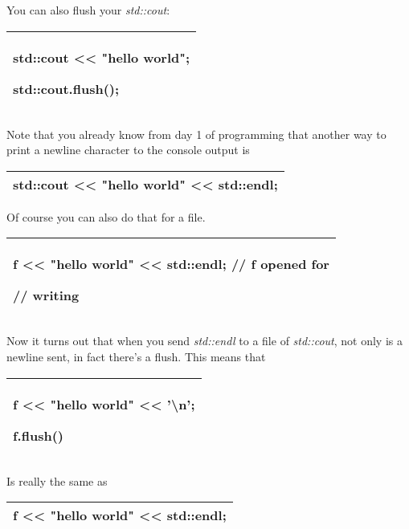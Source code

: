 \documentclass[
]{article}
\begin{document}
You can also flush your \emph{std::cout}:

\begin{longtable}[]{@{}l@{}}
\toprule
\endhead
\begin{minipage}[t]{0.97\columnwidth}\raggedright
std::cout \textless\textless{} "hello world";

std::cout.flush();\strut
\end{minipage}\tabularnewline
\bottomrule
\end{longtable}

Note that you already know from day 1 of programming that another way to
print a newline character to the console output is

\begin{longtable}[]{@{}l@{}}
\toprule
\endhead
std::cout \textless\textless{} "hello world" \textless\textless{}
std::endl;\tabularnewline
\bottomrule
\end{longtable}

Of course you can also do that for a file.

\begin{longtable}[]{@{}l@{}}
\toprule
\endhead
\begin{minipage}[t]{0.97\columnwidth}\raggedright
f \textless\textless{} "hello world" \textless\textless{} std::endl; //
f opened for

// writing \strut
\end{minipage}\tabularnewline
\bottomrule
\end{longtable}

Now it turns out that when you send \emph{std::endl} to a file of
\emph{std::cout}, not only is a newline sent, in fact there's a flush.
This means that

\begin{longtable}[]{@{}l@{}}
\toprule
\endhead
\begin{minipage}[t]{0.97\columnwidth}\raggedright
f \textless\textless{} "hello world" \textless\textless{}
'\textbackslash n';

f.flush() \strut
\end{minipage}\tabularnewline
\bottomrule
\end{longtable}

Is really the same as

\begin{longtable}[]{@{}l@{}}
\toprule
\endhead
f \textless\textless{} "hello world" \textless\textless{}
std::endl;\tabularnewline
\bottomrule
\end{longtable}
\end{document}
